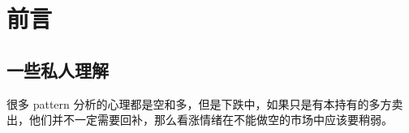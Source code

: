 \chapter*{前言}
\section{一些私人理解}
很多 pattern 分析的心理都是空和多，但是下跌中，如果只是有本持有的多方卖出，他们并不一定需要回补，那么看涨情绪在不能做空的市场中应该要稍弱。